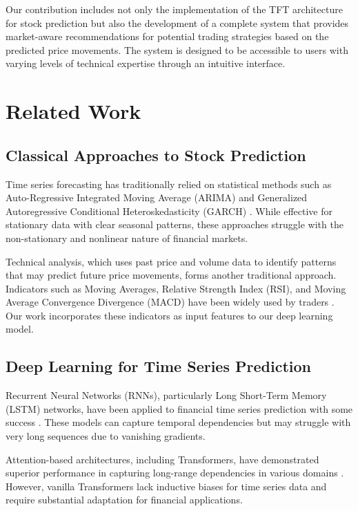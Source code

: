 \documentclass[conference]{IEEEtran}
\begin{document}
Our contribution includes not only the implementation of the TFT architecture for stock prediction but also the development of a complete system that provides market-aware recommendations for potential trading strategies based on the predicted price movements. The system is designed to be accessible to users with varying levels of technical expertise through an intuitive interface.

\section{Related Work}

\subsection{Classical Approaches to Stock Prediction}

Time series forecasting has traditionally relied on statistical methods such as Auto-Regressive Integrated Moving Average (ARIMA) and Generalized Autoregressive Conditional Heteroskedasticity (GARCH) \cite{box2015time}. While effective for stationary data with clear seasonal patterns, these approaches struggle with the non-stationary and nonlinear nature of financial markets.

Technical analysis, which uses past price and volume data to identify patterns that may predict future price movements, forms another traditional approach. Indicators such as Moving Averages, Relative Strength Index (RSI), and Moving Average Convergence Divergence (MACD) have been widely used by traders \cite{murphy1999technical}. Our work incorporates these indicators as input features to our deep learning model.

\subsection{Deep Learning for Time Series Prediction}

Recurrent Neural Networks (RNNs), particularly Long Short-Term Memory (LSTM) networks, have been applied to financial time series prediction with some success \cite{fischer2018deep}. These models can capture temporal dependencies but may struggle with very long sequences due to vanishing gradients.

Attention-based architectures, including Transformers, have demonstrated superior performance in capturing long-range dependencies in various domains \cite{vaswani2017attention}. However, vanilla Transformers lack inductive biases for time series data and require substantial adaptation for financial applications.
\end{document}
